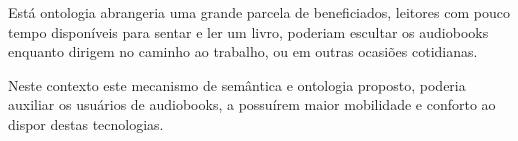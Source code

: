 Está ontologia abrangeria uma grande parcela de beneficiados, leitores com pouco tempo disponíveis para sentar e ler um livro, poderiam escultar os audiobooks enquanto dirigem no caminho ao trabalho, ou em outras ocasiões cotidianas. 

Neste contexto este mecanismo de semântica e ontologia proposto, poderia auxiliar os usuários de audiobooks, a possuírem maior mobilidade e conforto ao dispor destas tecnologias.
%
%
%
%
%


